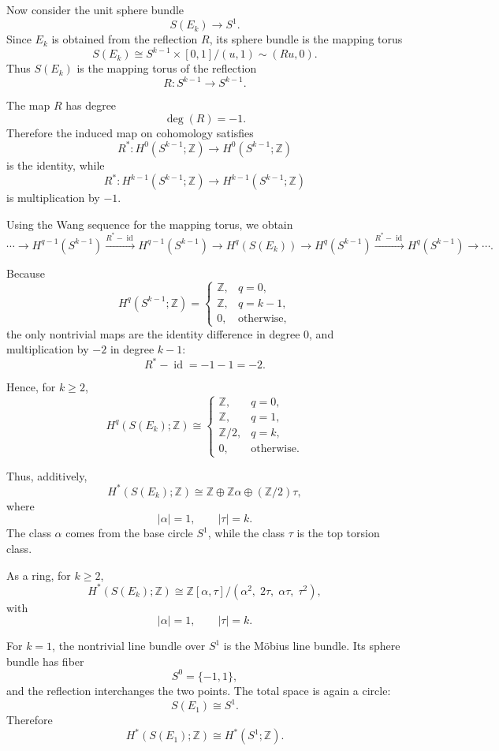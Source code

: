 \documentclass[12pt,a4paper]{article}
\theoremstyle{notespace}
\begin{document}
Now consider the unit sphere bundle
\[
S(E_k)\to S^1.
\]
Since \(E_k\) is obtained from the reflection \(R\), its sphere bundle is the mapping torus
\[
S(E_k)
\cong
S^{k-1}\times [0,1]
\big/
(u,1)\sim (Ru,0).
\]
Thus \(S(E_k)\) is the mapping torus of the reflection
\[
R:S^{k-1}\to S^{k-1}.
\]

The map \(R\) has degree
\[
\deg(R)=-1.
\]
Therefore the induced map on cohomology satisfies
\[
R^*:H^0(S^{k-1};\mathbb{Z})\to H^0(S^{k-1};\mathbb{Z})
\]
is the identity, while
\[
R^*:H^{k-1}(S^{k-1};\mathbb{Z})
\to
H^{k-1}(S^{k-1};\mathbb{Z})
\]
is multiplication by \(-1\).

Using the Wang sequence for the mapping torus, we obtain
\[
\cdots
\to
H^{q-1}(S^{k-1})
\xrightarrow{R^*-\operatorname{id}}
H^{q-1}(S^{k-1})
\to
H^q(S(E_k))
\to
H^q(S^{k-1})
\xrightarrow{R^*-\operatorname{id}}
H^q(S^{k-1})
\to
\cdots .
\]

Because
\[
H^q(S^{k-1};\mathbb{Z})
=
\begin{cases}
	\mathbb{Z}, & q=0,\\
	\mathbb{Z}, & q=k-1,\\
	0, & \text{otherwise},
\end{cases}
\]
the only nontrivial maps are the identity difference in degree \(0\), and multiplication by \(-2\) in degree \(k-1\):
\[
R^*-\operatorname{id}
=
-1-1
=
-2.
\]

Hence, for \(k\geq 2\),
\[
H^q(S(E_k);\mathbb{Z})
\cong
\begin{cases}
	\mathbb{Z}, & q=0,\\[2mm]
	\mathbb{Z}, & q=1,\\[2mm]
	\mathbb{Z}/2, & q=k,\\[2mm]
	0, & \text{otherwise}.
\end{cases}
\]

Thus, additively,
\[
H^*(S(E_k);\mathbb{Z})
\cong
\mathbb{Z}
\oplus
\mathbb{Z}\alpha
\oplus
(\mathbb{Z}/2)\tau,
\]
where
\[
|\alpha|=1,
\qquad
|\tau|=k.
\]
The class \(\alpha\) comes from the base circle \(S^1\), while the class \(\tau\) is the top torsion class.

As a ring, for \(k\geq 2\),
\[
H^*(S(E_k);\mathbb{Z})
\cong
\mathbb{Z}[\alpha,\tau]
\big/
(\alpha^2,\;2\tau,\;\alpha\tau,\;\tau^2),
\]
with
\[
|\alpha|=1,
\qquad
|\tau|=k.
\]

For \(k=1\), the nontrivial line bundle over \(S^1\) is the Möbius line bundle. Its sphere bundle has fiber
\[
S^0=\{-1,1\},
\]
and the reflection interchanges the two points. The total space is again a circle:
\[
S(E_1)\cong S^1.
\]
Therefore
\[
H^*(S(E_1);\mathbb{Z})
\cong
H^*(S^1;\mathbb{Z}).
\]
\end{document}
